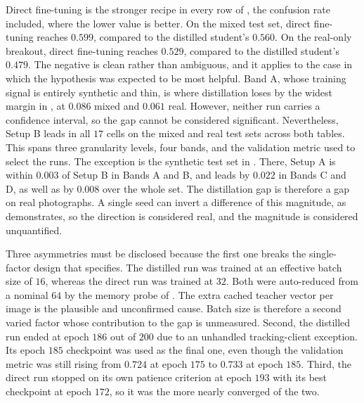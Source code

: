 Direct fine-tuning is the stronger recipe in every row of , the confusion rate included, where the lower value is better. On the mixed test set, direct fine-tuning reaches $0.599$, compared to the distilled student's $0.560$. On the real-only breakout, direct fine-tuning reaches $0.529$, compared to the distilled student's $0.479$. The negative is clean rather than ambiguous, and it applies to the case in which the hypothesis was expected to be most helpful. Band A, whose training signal is entirely synthetic and thin, is where distillation loses by the widest margin in , at $0.086$ mixed and $0.061$ real. However, neither run carries a confidence interval, so the gap cannot be considered significant. Nevertheless, Setup B leads in all $17$ cells on the mixed and real test sets across both tables. This spans three granularity levels, four bands, and the validation metric used to select the runs. The exception is the synthetic test set in . There, Setup A is within $0.003$ of Setup B in Bands A and B, and leads by $0.022$ in Bands C and D, as well as by $0.008$ over the whole set. The distillation gap is therefore a gap on real photographs.  %
A single seed can invert a difference of this magnitude, as  demonstrates, so the direction is considered real, and the magnitude is considered unquantified.

Three asymmetries must be disclosed because the first one breaks the single-factor design that  specifies. The distilled run was trained at an effective batch size of $16$, whereas the direct run was trained at $32$. Both were auto-reduced from a nominal $64$ by the memory probe of . The extra cached teacher vector per image is the plausible and unconfirmed cause.  %
Batch size is therefore a second varied factor whose contribution to the gap is unmeasured. Second, the distilled run ended at epoch $186$ out of $200$ due to an unhandled tracking-client exception. Its epoch $185$ checkpoint was used as the final one, even though the validation metric was still rising from $0.724$ at epoch $175$ to $0.733$ at epoch $185$.  %
Third, the direct run stopped on its own patience criterion at epoch $193$ with its best checkpoint at epoch $172$, so it was the more nearly converged of the two.

